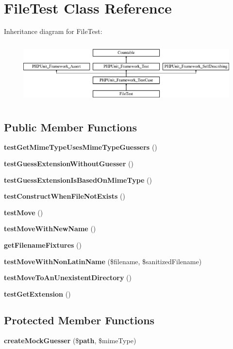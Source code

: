 \section{File\+Test Class Reference}
\label{class_symfony_1_1_component_1_1_http_foundation_1_1_tests_1_1_file_1_1_file_test}
Inheritance diagram for File\+Test\+:\begin{figure}[H]
\begin{center}
\leavevmode
\includegraphics[height=3.303835cm]{class_symfony_1_1_component_1_1_http_foundation_1_1_tests_1_1_file_1_1_file_test}
\end{center}
\end{figure}
\subsection*{Public Member Functions}
\begin{DoxyCompactItemize}
\item 
{\bf test\+Get\+Mime\+Type\+Uses\+Mime\+Type\+Guessers} ()
\item 
{\bf test\+Guess\+Extension\+Without\+Guesser} ()
\item 
{\bf test\+Guess\+Extension\+Is\+Based\+On\+Mime\+Type} ()
\item 
{\bf test\+Construct\+When\+File\+Not\+Exists} ()
\item 
{\bf test\+Move} ()
\item 
{\bf test\+Move\+With\+New\+Name} ()
\item 
{\bf get\+Filename\+Fixtures} ()
\item 
{\bf test\+Move\+With\+Non\+Latin\+Name} (\$filename, \$sanitized\+Filename)
\item 
{\bf test\+Move\+To\+An\+Unexistent\+Directory} ()
\item 
{\bf test\+Get\+Extension} ()
\end{DoxyCompactItemize}
\subsection*{Protected Member Functions}
\begin{DoxyCompactItemize}
\item 
{\bf create\+Mock\+Guesser} (\${\bf path}, \$mime\+Type)
\end{DoxyCompactItemize}
